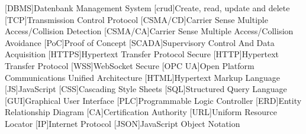\begin{multicols}{2}
  \begin{acronym}
  [DBMS]{Datenbank Management  System}
  [crud]{Create, read, update and delete}
  [TCP]{Transmission Control Protocol}
  [CSMA/CD]{Carrier Sense Multiple Access/Collision Detection}
  [CSMA/CA]{Carrier Sense Multiple Access/Collision Avoidance}
  [PoC]{Proof of Concept}
  [SCADA]{Supervisory Control And Data Acquisition}
  [HTTPS]{Hypertext Transfer Protocol Secure}
  [HTTP]{Hypertext Transfer Protocol}
  [WSS]{WebSocket Secure}
  [OPC UA]{Open Platform Communications Unified Architecture}
  [HTML]{Hypertext Markup Language}
  [JS]{JavaScript}
  [CSS]{Cascading Style Sheets}
  [SQL]{Structured Query Language}
  [GUI]{Graphical User Interface}
  [PLC]{Programmable Logic Controller}
  [ERD]{Entity Relationship Diagram}
  [CA]{Certification Authority}
  [URL]{Uniform Resource Locator}
  [IP]{Internet Protocol}
  [JSON]{JavaScript Object Notation}
\end{acronym}
\end{multicols}
